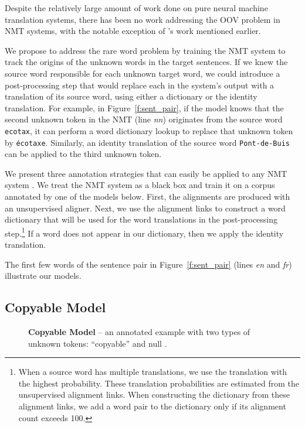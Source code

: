 Despite the relatively large amount of work done on pure neural machine translation systems, 
there has been no work addressing the OOV problem in NMT systems, 
with the notable exception of 's work mentioned earlier. 

We propose to address the rare word problem by training the NMT system
to track the origins of the unknown words in the target sentences.  If
we knew the source word responsible for each unknown target word, we could introduce
a post-processing step that would replace each \unksym{} in the system's output
with a translation of its source word, using 
either a dictionary or the identity translation.  For example, in
Figure~\ref{f:sent_pair}, if the model knows that the second unknown token 
in the NMT (line {\it nn}) originates from the source
word \texttt{ecotax}, it can perform a word dictionary lookup to
replace that unknown token by \texttt{\'{e}cotaxe}. Similarly, an
identity translation of the source word \texttt{Pont-de-Buis} can be
applied to the third unknown token.

We present three annotation strategies that can easily be applied to any NMT system \cite{kal13,sutskever14,cho14}. 
We treat the NMT system as a black box and train it on a corpus annotated by one of the models below. 
First, the alignments are produced with an unsupervised aligner. 
Next, we use the alignment links to construct a word dictionary that will 
be used for the word translations in the post-processing step.\footnote{When a source word has multiple translations, we use the translation with the highest probability. These translation probabilities are estimated from the unsupervised alignment links. When constructing the dictionary from these alignment links, we add a word pair to the dictionary only if its alignment count exceeds 100.}
If a word does not appear in our dictionary, then we apply the identity translation.

The first few words of the sentence pair in Figure~\ref{f:sent_pair} (lines {\it en}
and {\it fr}) illustrate our models. 

\subsection{Copyable Model}
\label{subsec:copyable}
\begin{figure}
\caption[Copyable Model]{ {\bf Copyable Model} -- an annotated example with two 
types of unknown tokens: ``copyable''  and null \unknull{}.}
\label{f:copyable}
\end{figure}

